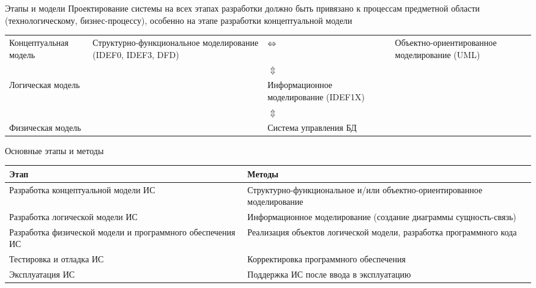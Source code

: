 \documentclass[12pt]{article}
\begin{document}
\begin{nota}{Этапы и модели}
    Проектирование системы на всех этапах разработки должно быть привязано к процессам предметной области (технологическому, бизнес-процессу), особенно на этапе разработки концептуальной модели 

    \begin{center}
        \begin{tabular}{>{\centering\arraybackslash}m{7em} >{\centering\arraybackslash}m{10em} >{\centering\arraybackslash}m{8em} >{\centering\arraybackslash}m{10em}}
            Концептуальная модель & Структурно-функциональное моделирование (IDEF0, IDEF3, DFD) & ${\centering \Leftrightarrow}$ & Объектно-ориентированное моделирование (UML) \\
            & & $\Updownarrow$ & \\
            Логическая модель & & Информационное моделирование (IDEF1X) & \\
            & & $\Updownarrow$ & \\
            Физическая модель & & Система управления БД & \\
        \end{tabular}
    \end{center}
\end{nota}

\begin{nota}{Основные этапы и методы}
    \begin{center}
        \begin{tabular}{|m{15em}|m{20em}|}
            \hline
            Этап & Методы \\
            \hline
            Разработка концептуальной модели ИС & Структурно-функциональное и/или объектно-ориентированное моделирование \\
            \hline
            Разработка логической модели ИС & Информационное моделирование (создание диаграммы сущность-связь) \\
            \hline
            Разработка физической модели и программного обеспечения ИС & Реализация объектов логической модели, разработка программного кода \\
            \hline
            Тестировка и отладка ИС & Корректировка программного обеспечения \\
            \hline
            Эксплуатация ИС & Поддержка ИС после ввода в эксплуатацию \\
            \hline
        \end{tabular}
    \end{center}
\end{nota}
\end{document}
